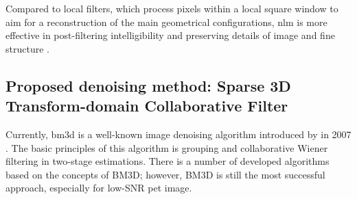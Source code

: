 Compared to local filters, which process pixels within a local square window to aim
for a reconstruction of the main geometrical configurations, \gls{nlm} is more effective
in post-filtering intelligibility and preserving details of image and fine structure \cite{buades2005non}.


\subsection{Proposed denoising method: Sparse 3D Transform-domain Collaborative Filter}
Currently, \gls{bm3d} is a well-known
image denoising algorithm introduced by \citeauthor{dabov2007image} in 2007 \cite{dabov2007image}. The basic principles
of this algorithm is grouping and collaborative Wiener filtering in two-stage
estimations. There is a number of developed algorithms based on the concepts of
BM3D; however, BM3D is still the most successful
approach, especially for low-SNR \gls{pet} image.



